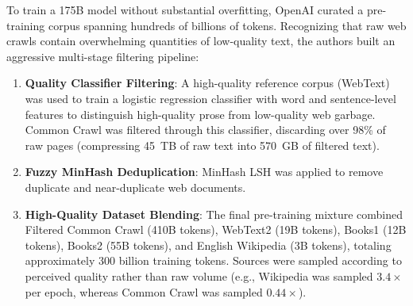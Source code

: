 \documentclass[../../main.tex]{subfiles}
\begin{document}
To train a 175B model without substantial overfitting, OpenAI curated a pre-training corpus spanning hundreds of billions of tokens. Recognizing that raw web crawls contain overwhelming quantities of low-quality text, the authors built an aggressive multi-stage filtering pipeline:
\begin{enumerate}
    \item \textbf{Quality Classifier Filtering}: A high-quality reference corpus (WebText) was used to train a logistic regression classifier with word and sentence-level features to distinguish high-quality prose from low-quality web garbage. Common Crawl was filtered through this classifier, discarding over 98\% of raw pages (compressing 45~TB of raw text into 570~GB of filtered text).
    \item \textbf{Fuzzy MinHash Deduplication}: MinHash LSH was applied to remove duplicate and near-duplicate web documents.
    \item \textbf{High-Quality Dataset Blending}: The final pre-training mixture combined Filtered Common Crawl (410B tokens), WebText2 (19B tokens), Books1 (12B tokens), Books2 (55B tokens), and English Wikipedia (3B tokens), totaling approximately 300 billion training tokens. Sources were sampled according to perceived quality rather than raw volume (e.g., Wikipedia was sampled $3.4\times$ per epoch, whereas Common Crawl was sampled $0.44\times$).
\end{enumerate}
\end{document}
